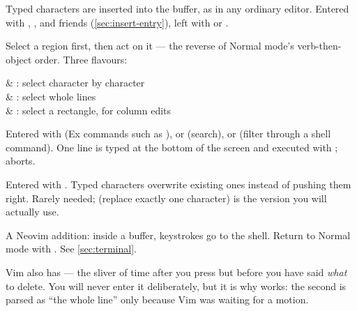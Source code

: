 \begin{definition}
	Typed characters are inserted into the buffer, as in any ordinary editor.
	Entered with , ,  and friends (\autoref{sec:insert-entry}),
	left with  or \key{<C-[>}.
\end{definition}

\begin{definition}
	Select a region first, then act on it --- the reverse of Normal mode's
	verb-then-object order. Three flavours:
	\begin{keys}[0.16]
		      & : select character by character                 \\
		      & : select whole lines                            \\
		  & : select a rectangle, for column edits         \\
	\end{keys}
\end{definition}

\begin{definition}
	Entered with \key{:} (Ex commands such as ), \key{/} or 
	(search), or \key{!} (filter through a shell command). One line is typed at the
	bottom of the screen and executed with ;  aborts.
\end{definition}

\begin{definition}
	Entered with . Typed characters overwrite existing ones instead of
	pushing them right. Rarely needed;  (replace exactly one character) is
	the version you will actually use.
\end{definition}

\begin{definition}
	A Neovim addition: inside a  buffer, keystrokes go to the shell.
	Return to Normal mode with  . See
	\autoref{sec:terminal}.
\end{definition}

\begin{remark}
	Vim also has  --- the sliver of time after you
	press  but before you have said \emph{what} to delete. You will never
	enter it deliberately, but it is why   works: the second 
	is parsed as ``the whole line'' only because Vim was waiting for a motion.
\end{remark}


